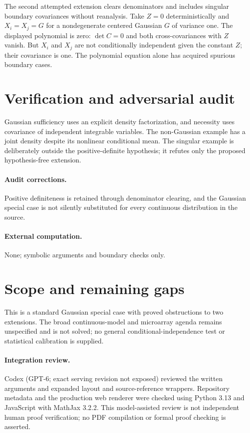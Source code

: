 \documentclass[11pt]{article}
\begin{document}
The second attempted extension clears denominators and includes singular boundary covariances without reanalysis. Take $Z=0$ deterministically and $X_i=X_j=G$ for a nondegenerate centered Gaussian $G$ of variance one. The displayed polynomial is zero: $\det C=0$ and both cross-covariances with $Z$ vanish. But $X_i$ and $X_j$ are not conditionally independent given the constant $Z$; their covariance is one. The polynomial equation alone has acquired spurious boundary cases.
\section{Verification and adversarial audit}
Gaussian sufficiency uses an explicit density factorization, and necessity uses covariance of independent integrable variables. The non-Gaussian example has a joint density despite its nonlinear conditional mean. The singular example is deliberately outside the positive-definite hypothesis; it refutes only the proposed hypothesis-free extension.
\paragraph{Audit corrections.} Positive definiteness is retained through denominator clearing, and the Gaussian special case is not silently substituted for every continuous distribution in the source.
\paragraph{External computation.} None; symbolic arguments and boundary checks only.
\section{Scope and remaining gaps}
This is a standard Gaussian special case with proved obstructions to two extensions. The broad continuous-model and microarray agenda remains unspecified and is not solved; no general conditional-independence test or statistical calibration is supplied.
\paragraph{Integration review.} Codex (GPT-6; exact serving revision not exposed) reviewed the written arguments and expanded layout and source-reference wrappers. Repository metadata and the production web renderer were checked using Python 3.13 and JavaScript with MathJax 3.2.2. This model-assisted review is not independent human proof verification; no PDF compilation or formal proof checking is asserted.
\end{document}
